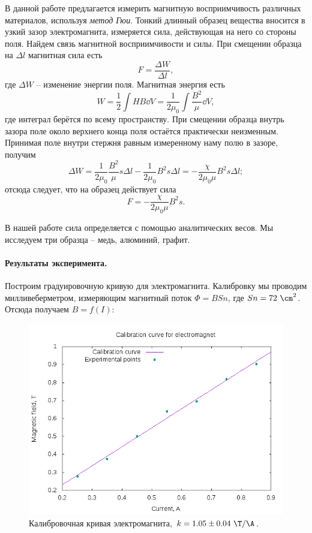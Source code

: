 \documentclass{../lab_class}
\begin{document}
В данной работе предлагается измерить магнитную восприимчивость различных материалов, используя \emph{метод Гюи}. Тонкий длинный образец вещества вносится в узкий зазор электромагнита, измеряется сила, действующая на него со стороны поля. Найдем связь магнитной восприимчивости и силы. При смещении образца на $\Delta l$ магнитная сила есть
\begin{equation}
	F = \frac{\Delta W}{\Delta l},
\end{equation}
где $\Delta W$ -- изменение энергии поля. Магнитная энергия есть
\begin{equation}
	W = \frac{1}{2} \int H B \dd{V} = \frac{1}{2\mu_0} \int \frac{B^2}{\mu} \dd{V},
\end{equation}
где интеграл берётся по всему пространству. При смещении образца внутрь зазора поле около верхнего конца поля остаётся практически неизменным. Принимая поле внутри стержня равным измеренному наму полю в зазоре, получим
\begin{equation}
	\Delta W = \frac{1}{2\mu_0} \frac{B^2}{\mu} s \Delta l - \frac{1}{2\mu_0} B^2 s \Delta l = -\frac{\chi}{2\mu_0\mu} B^2 s \Delta l;
\end{equation}
отсюда следует, что на образец действует сила
\begin{equation}\label{eq:main}
	F = -\frac{\chi}{2\mu_0\mu} B^2 s.
\end{equation}

В нашей работе сила определяется с помощью аналитических весов. Мы исследуем три образца -- медь, алюминий, графит.

\paragraph{Результаты эксперимента.}

Построим градуировочную кривую для электромагнита. Калибровку мы проводим милливеберметром, измеряющим магнитный поток $\Phi = B S n$, где $S n = 72 \ \cm^2$. Отсюда получаем $B = f(I)$:

\begin{figure}[H]
\centering
\includegraphics[width = 0.87 \textwidth]{calibration_curve.png}
\caption{Калибровочная кривая электромагнита, $k = 1.05 \pm 0.04 \ \T / \A$.}
\end{figure}
\end{document}
